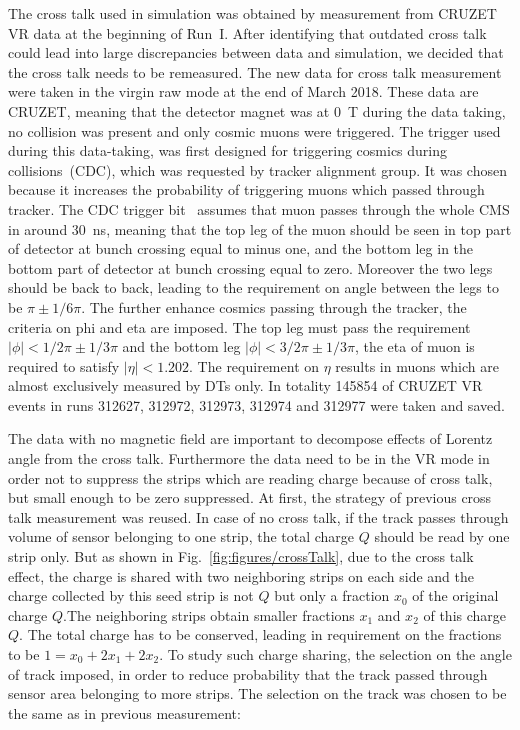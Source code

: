 The cross talk used in simulation was obtained by measurement from CRUZET VR data at the beginning of Run~I. After identifying that outdated cross talk could lead into large discrepancies between data and simulation, we decided that the cross talk needs to be remeasured. The new data for cross talk measurement were taken in the virgin raw mode at the end of March 2018. These data are CRUZET, meaning that the detector magnet was at 0~T during the data taking, no collision was present and only cosmic muons were triggered. The trigger used during this data-taking, was first designed for triggering cosmics during collisions~(CDC), which was requested by tracker alignment group. It was chosen because it increases the probability of triggering muons which passed through tracker. The CDC trigger bit~\cite{website:trigger} assumes that muon passes through the whole CMS in around 30~ns, meaning that the top leg of the muon should be seen in top part of detector at bunch crossing equal to minus one, and the bottom leg in the bottom part of detector at bunch crossing equal to zero. Moreover the two legs should be back to back, leading to the requirement on angle between the legs to be $\pi \pm 1/6\pi$. The further enhance cosmics passing through the tracker, the criteria on phi and eta are imposed. The top leg must pass the requirement $|\phi|<1/2\pi \pm 1/3\pi$ and the bottom leg $|\phi|<3/2\pi \pm 1/3\pi$, the eta of muon is required to satisfy $|\eta|<1.202$. The requirement on $\eta$ results in muons which are almost exclusively measured by DTs only. In totality 145854 of CRUZET VR events in runs 312627, 312972, 312973, 312974 and 312977 were taken and saved.

The data with no magnetic field are important to decompose effects of Lorentz angle from the cross talk. Furthermore the data need to be in the VR mode in order not to suppress the strips which are reading charge because of cross talk, but small enough to be zero suppressed. At first, the strategy of previous cross talk measurement was reused. In case of no cross talk, if the track passes through volume of sensor belonging to one strip, the total charge $Q$ should be read by one strip only. But as shown in Fig.~\ref{fig:figures/crossTalk}, due to the cross talk effect, the charge is shared with two neighboring strips on each side and the charge collected by this seed strip is not $Q$ but only a fraction $x_{0}$ of the original charge $Q$.The neighboring strips obtain smaller fractions $x_{1}$ and $x_{2}$ of this charge $Q$. The total charge has to be conserved, leading in requirement on the fractions to be $1=x_{0}+2x_{1}+2x_{2}$. To study such charge sharing, the selection on the angle of track imposed, in order to reduce probability that the track passed through sensor area belonging to more strips. The selection on the track was chosen to be the same as in previous measurement:

